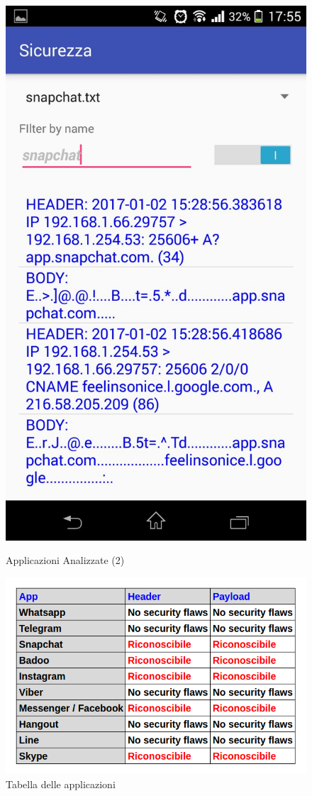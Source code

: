 \documentclass[12pt]{article} %
\begin{document}
\begin{figure}[htbp]
{\includegraphics[scale=0.2]{./snap.jpeg}}
\caption{Applicazioni Analizzate (2)\label{fig:app2}}
\end{figure}

\begin{figure}
\centering
\includegraphics[scale=0.58]{./tabella.png}
\caption{Tabella delle applicazioni\label{fig:table}}
\end{figure}
\end{document}
